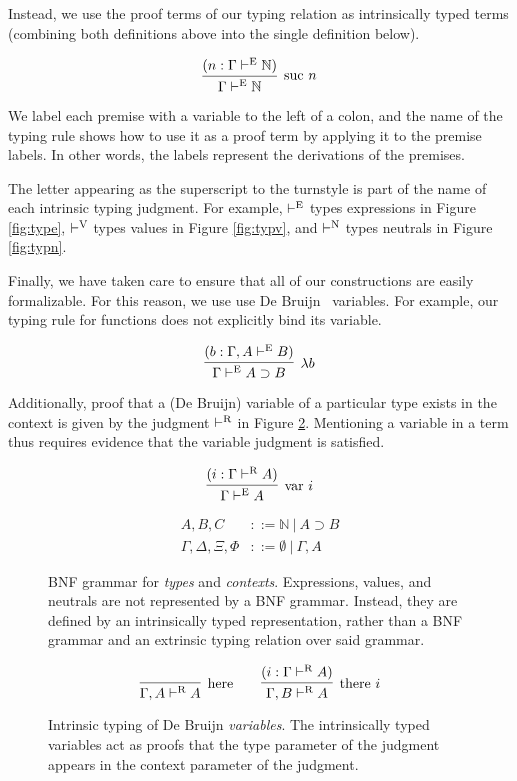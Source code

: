 \documentclass{llncs}
\newcommand{\reffig}[1]{Figure \ref{fig:#1}}
\def\arr{\supset}
\def\lam{\lambda}
\def\nat{\mathbb{N}}
\def\emp{\emptyset}
\newcommand{\turn}[1]{\vdash^\con{#1}}
\newcommand{\con}[1]{\textmd{#1}}
\newcommand{\fun}[1]{\textmd{#1}}
\newcommand{\type}[1]{\Gamma \turn{E} #1}
\newcommand{\ctype}[2]{\Gamma , #1 \turn{E} #2}
\newcommand{\typr}[1]{\Gamma \turn{R} #1}
\newcommand{\ctypr}[2]{\Gamma , #1 \turn{R} #2}
\begin{document}
Instead, we use the proof terms of our typing relation as
intrinsically typed terms (combining both definitions above into the
single definition below).

$$
\infer
  [\con{suc} ~ n]
  {\type{\nat}}
{
  (n : \type{\nat})
}
$$

We label each premise with a variable to
the left of a colon, and the name of the typing rule shows how to use
it as a proof term by applying it to the premise labels. In other
words, the labels represent the derivations of the premises.

The letter appearing as the superscript to the turnstyle is part of
the name of each intrinsic typing judgment. For example, $\turn{E}$
types expressions in \reffig{type}, $\turn{V}$ types values in
\reffig{typv}, and $\turn{N}$ types neutrals in \reffig{typn}.

Finally, we have taken care to ensure that all of our constructions
are easily formalizable. For this reason, we
use use De Bruijn~\cite{TODO} variables. For example, our typing rule
for functions does not explicitly bind its variable.

$$
\infer
  [\lam b]
  {\type{A \arr B}}
{
  (b : \ctype{A}{B})
}
$$

Additionally, proof that a (De Bruijn) variable of a particular type
exists in the context is given by the judgment $\turn{R}$ in
\reffig{typr}. Mentioning a variable in a term thus requires evidence
that the variable judgment is satisfied.

$$
\infer
  [\fun{var} ~ i]
  {\type{A}}
{
  (i : \typr{A})
}
$$

\begin{figure}[t!]
\caption{
BNF grammar for \textit{types} and \textit{contexts}. 
Expressions, values, and neutrals
are not represented by a BNF grammar. Instead, they are defined by
an intrinsically typed representation, rather than a BNF grammar and
an extrinsic typing relation over said grammar.
}
\begin{align*}
A, B, C &::= \nat ~ | ~ A \arr B \\
\Gamma, \Delta, \Xi, \Phi &::= \emp ~ | ~ \Gamma , A
\end{align*}
\label{fig:gram}
\end{figure}

\begin{figure}[t!]
\caption{
Intrinsic typing of De Bruijn \textit{variables}.
The intrinsically typed variables act as proofs that the type
parameter of the judgment appears in the context parameter of the
judgment.
}
$$
\infer
  [\con{here}]
  {\ctypr{A}{A}}
{
}
\qquad
\infer
  [\con{there} ~ i]
  {\ctypr{B}{A}}
{
  (i : \typr{A})
}
$$
\label{fig:typr}
\end{figure}
\end{document}
